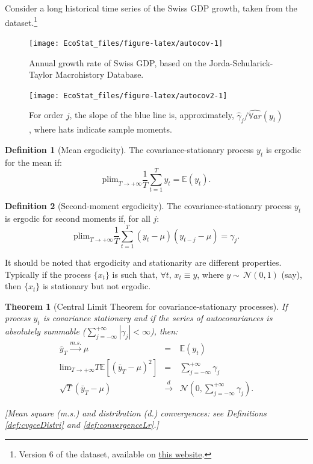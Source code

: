 \documentclass[
  12pt,
]{book}
\newtheorem{theorem}{Theorem}[chapter]
\theoremstyle{definition}
\newtheorem{definition}{Definition}[chapter]
\theoremstyle{definition}
\theoremstyle{definition}
\theoremstyle{definition}
\theoremstyle{remark}
\begin{document}
Consider a long historical time series of the Swiss GDP growth, taken from the \citet{JST_2017} dataset.\footnote{Version 6 of the dataset, available on \href{https://www.macrohistory.net}{this website}.}

\begin{figure}
\texttt{[image: EcoStat\_files/figure-latex/autocov-1]} \caption{Annual growth rate of Swiss GDP, based on the Jorda-Schularick-Taylor Macrohistory Database.}\label{fig:autocov}
\end{figure}

\begin{figure}
\texttt{[image: EcoStat\_files/figure-latex/autocov2-1]} \caption{For order $j$, the slope of the blue line is, approximately, $\hat{\gamma}_j/\widehat{\mathbb{V}ar}(y_t)$, where hats indicate sample moments.}\label{fig:autocov2}
\end{figure}

\begin{definition}[Mean ergodicity]
\protect\hypertarget{def:ergodicity}{}\label{def:ergodicity}The covariance-stationary process \(y_t\) is ergodic for the mean if:
\[
\mbox{plim}_{T \rightarrow +\infty} \frac{1}{T}\sum_{t=1}^T y_t = \mathbb{E}(y_t).
\]
\end{definition}

\begin{definition}[Second-moment ergodicity]
\protect\hypertarget{def:ergod2nd}{}\label{def:ergod2nd}The covariance-stationary process \(y_t\) is ergodic for second moments if, for all \(j\):
\[
\mbox{plim}_{T \rightarrow +\infty} \frac{1}{T}\sum_{t=1}^T (y_t-\mu) (y_{t-j}-\mu) = \gamma_j.
\]
\end{definition}

It should be noted that ergodicity and stationarity are different properties. Typically if the process \(\{x_t\}\) is such that, \(\forall t\), \(x_t \equiv y\), where \(y \sim\,\mathcal{N}(0,1)\) (say), then \(\{x_t\}\) is stationary but not ergodic.

\begin{theorem}[Central Limit Theorem for covariance-stationary processes]
\protect\hypertarget{thm:CLTcovstat}{}\label{thm:CLTcovstat}If process \(y_t\) is covariance stationary and if the series of autocovariances is absolutely summable (\(\sum_{j=-\infty}^{+\infty} |\gamma_j| <\infty\)), then:
\begin{eqnarray}
\bar{y}_T \overset{m.s.}{\rightarrow} \mu &=& \mathbb{E}(y_t) \label{eq:TCL20}\\
\mbox{lim}_{T \rightarrow +\infty} T \mathbb{E}\left[(\bar{y}_T - \mu)^2\right] &=& \sum_{j=-\infty}^{+\infty} \gamma_j \label{eq:TCL2}\\
\sqrt{T}(\bar{y}_T - \mu) &\overset{d}{\rightarrow}& \mathcal{N}\left(0,\sum_{j=-\infty}^{+\infty} \gamma_j \right) \label{eq:TCL4ts}.
\end{eqnarray}

{[}Mean square (m.s.) and distribution (d.) convergences: see Definitions \ref{def:cvgceDistri} and \ref{def:convergenceLr}.{]}
\end{theorem}
\end{document}
